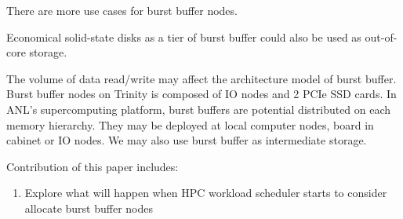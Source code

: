 There are more use cases for burst buffer nodes.

Economical solid-state disks as a tier of burst buffer could also be used as
out-of-core storage.


The volume of data read/write may affect the architecture model of burst buffer.
Burst buffer nodes on Trinity is composed of IO nodes and 2 PCIe SSD cards.
In ANL's supercomputing platform, burst buffers are potential distributed
on each memory hierarchy.
They may be deployed at local computer nodes, board in cabinet or IO nodes.
We may also use burst buffer as intermediate storage.



Contribution of this paper includes:
\begin{enumerate}
        \item Explore what will happen when HPC workload scheduler starts to consider
        allocate burst buffer nodes
\end{enumerate}





